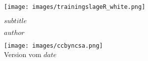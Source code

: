 \setlength\parindent{0pt}      %
\begin{titlepage}
  \begin{center}
  \texttt{[image: images/trainingslageR\_white.png]}

  \vspace{10mm}
  \begin{minipage}[]{0.85\textwidth}
    \begin{center}
      {\color{HSNRblue1}
      \Huge $subtitle$
      }
    \end{center}
  \end{minipage}

  \vspace{6mm}

  \normalsize $author$

   \vspace{10mm}


  \vfill
  \texttt{[image: images/ccbyncsa.png]}\\
  \footnotesize Version vom $date$
  \end{center}

\thispagestyle{empty}
\end{titlepage}
